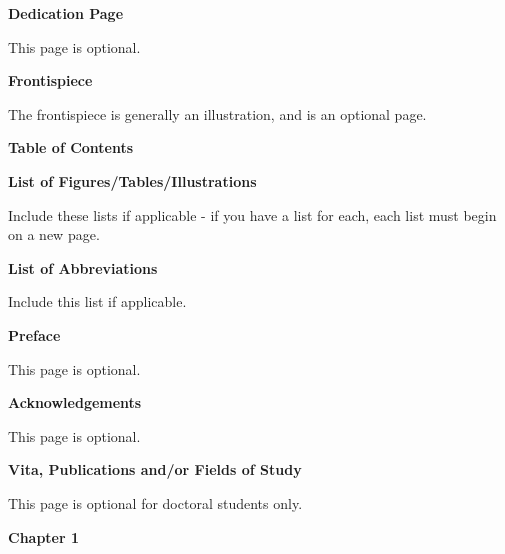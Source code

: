 \documentclass[12pt]{article}
\begin{document}
\newpage
\centerline{\bf{Dedication Page}}
\vspace*{4\baselineskip}
This page is optional.

\newpage
\centerline{\bf{Frontispiece}}
\vspace*{4\baselineskip}
The frontispiece is generally an illustration, and is an optional page.

\newpage
\centerline{\bf{Table of Contents}}

\newpage
\centerline{\bf{List of Figures/Tables/Illustrations}}
\vspace*{4\baselineskip}
Include these lists if applicable - if you have a list for each, each list must begin on a new page.

\newpage
\centerline{\bf{List of Abbreviations}}
\vspace*{4\baselineskip}
Include this list if applicable.

\newpage
\centerline{\bf{Preface}}
\vspace*{4\baselineskip}
This page is optional.

\newpage
\centerline{\bf{Acknowledgements}}
\vspace*{4\baselineskip}
This page is optional.

\newpage
\centerline{\bf{Vita, Publications and/or Fields of Study}}
\vspace*{4\baselineskip}
This page is optional for doctoral students only.

\newpage
{}
\centerline{\bf{Chapter 1}}


    
    
    
 
\end{document}
